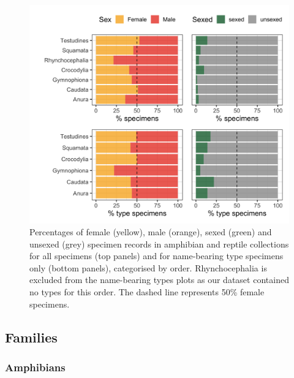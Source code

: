 \documentclass[a4paper, 12pt]{article}
\begin{document}
\begin{figure}[H]
 \centering
  \includegraphics[width = \linewidth]{figures/types-order.png}
  \caption{Percentages of female (yellow), male (orange), sexed (green) and unsexed (grey) specimen records in amphibian and reptile collections for all specimens (top panels) and for name-bearing type specimens only (bottom panels), categorised by order. Rhynchocephalia is excluded from the name-bearing types plots as our dataset contained no types for this order. 
  The dashed line represents 50\% female specimens.}
  \label{fig-types-order}
\end{figure}

\newpage
\subsection{Families}

\subsubsection{Amphibians}



\newpage
\end{document}
